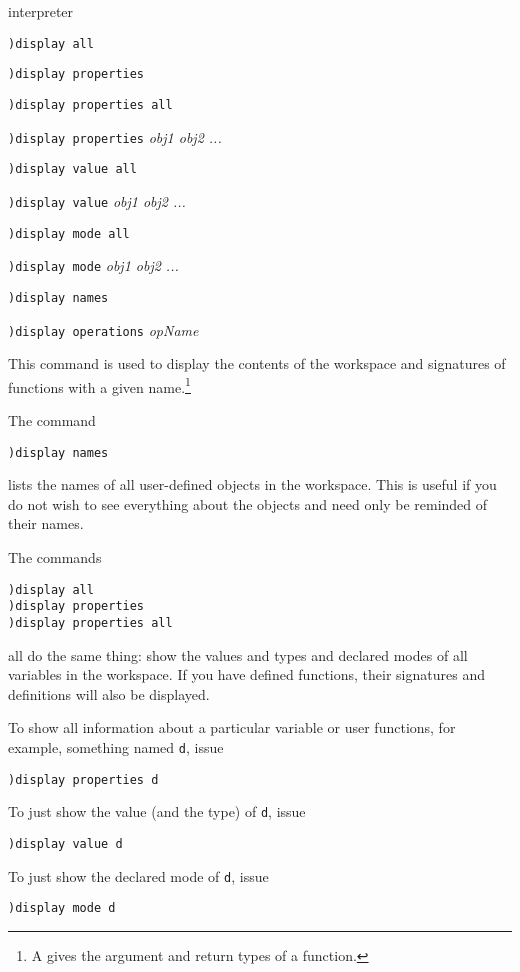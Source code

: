 

\par{} interpreter

\par{}
\begin{simpleList}
\item {\tt )display all}
\item {\tt )display properties}
\item {\tt )display properties all}
\item {\tt )display properties} {\it \lanb{}obj1 \lanb{}obj2 ...\ranb{}\ranb{}}
\item {\tt )display value all}
\item {\tt )display value} {\it \lanb{}obj1 \lanb{}obj2 ...\ranb{}\ranb{}}
\item {\tt )display mode all}
\item {\tt )display mode} {\it \lanb{}obj1 \lanb{}obj2 ...\ranb{}\ranb{}}
\item {\tt )display names}
\item {\tt )display operations} {\it opName}
\end{simpleList}
\par{}

This command is  used to display the contents of  the workspace and
signatures of functions  with a  given  name.\footnote{A
 gives the argument and return types of a
function.}

The command
\begin{verbatim}
)display names
\end{verbatim}
lists the names of all user-defined  objects in the workspace.  This is useful
if you do  not wish to see everything  about the objects and need  only be
reminded of their names.

The commands
\begin{verbatim}
)display all
)display properties
)display properties all
\end{verbatim}
all do  the same thing: show  the values and  types and declared modes  of all
variables in the  workspace.  If you have defined  functions, their signatures
and definitions will also be displayed.

To show all information about a  particular variable or user functions,
for example, something named {\tt d}, issue
\begin{verbatim}
)display properties d
\end{verbatim}
To just show the value (and the type) of {\tt d}, issue
\begin{verbatim}
)display value d
\end{verbatim}
To just show the declared mode of {\tt d}, issue
\begin{verbatim}
)display mode d
\end{verbatim}


